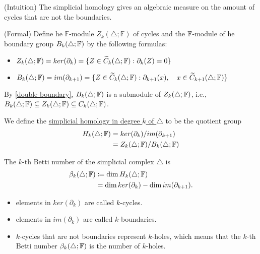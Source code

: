 \begin{defn}
\label{kth-homology-group}
    (Intuition) The simplicial homology gives an algebraic measure on the amount of cycles that are not the boundaries. 

    (Formal) Define he $\mathbb{F}$-module $Z_k(\triangle; \mathbb{F})$ of cycles and the $\mathbb{F}$-module of he boundary group $B_k(\triangle;\mathbb{F})$ by the following formulas:
    \begin{itemize}
        \item $Z_k(\triangle; \mathbb{F}) = ker(\partial_k) = \{Z \in \widetilde{C}_k(\triangle; \mathbb{F}): \partial_k(Z) = 0\}$ 
        \item $B_k(\triangle;\mathbb{F}) = im(\partial_{k+1}) = \{Z \in \widetilde{C}_k(\triangle; \mathbb{F}): \partial_{k+1}(x), \quad x \in \widetilde{C}_{k+1}(\triangle; \mathbb{F})\}$ 
    \end{itemize}
    
    By \ref{double-boundary}, $B_k(\triangle;\mathbb{F})$ is a submodule of $Z_k(\triangle;\mathbb{F})$, i.e., $B_k(\triangle;\mathbb{F})\subseteq Z_k(\triangle;\mathbb{F}) \subseteq C_k(\triangle;\mathbb{F})$. 
    
    We define the \underline{simplicial homology in degree $k$ of $\triangle$} to be the quotient group
    \begin{align}
        H_k(\triangle;\mathbb{F}) &= ker(\partial_k) / im(\partial_{k+1})\\
        &= Z_k(\triangle;\mathbb{F}) / B_k(\triangle;\mathbb{F})
    \end{align}
\end{defn}

\begin{defn}
\label{kth-betti}
    The $k$-th Betti number of the simplicial complex $\triangle$ is
    \begin{align}
        \beta_k(\triangle;\mathbb{F}) &\coloneqq \dim H_k(\triangle;\mathbb{F}) \\
        &= \dim ker(\partial_k) - \dim im(\partial_{k + 1}).
    \end{align}
    
    \begin{itemize}
        \item elements in $ker(\partial_k)$ are called $k$-cycles.
        \item elements in $im(\partial_k)$ are called $k$-boundaries.
        \item $k$-cycles that are not boundaries represent $k$-holes, which means that the $k$-th Betti number $\beta_k(\triangle; \mathbb{F})$ is the number of $k$-holes. 
    \end{itemize}
\end{defn} 

